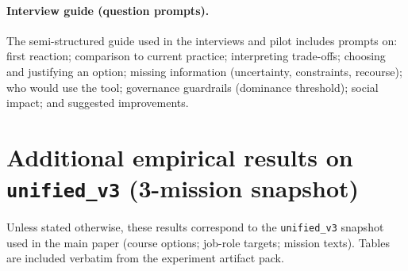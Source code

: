 \documentclass{article}
\begin{document}
\paragraph{Interview guide (question prompts).} The semi-structured guide used in the interviews and pilot includes prompts on: first reaction; comparison to current practice; interpreting trade-offs; choosing and justifying an option; missing information (uncertainty, constraints, recourse); who would use the tool; governance guardrails (dominance threshold); social impact; and suggested improvements.

\section{Additional empirical results on \texttt{unified\_v3} (3-mission snapshot)}
\label{sec:supp-results}
Unless stated otherwise, these results correspond to the \texttt{unified\_v3} snapshot used in the main paper (\NumCourses course options; \NumOccupations job-role targets; \NumMissionsMain mission texts). Tables are included verbatim from the experiment artifact pack.










\end{document}
